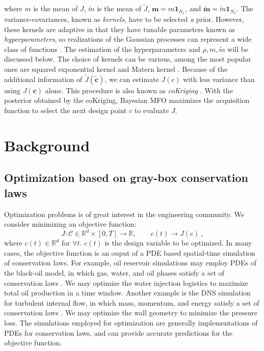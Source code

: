 \documentclass[a4paper,onecolumn]{article}
\theoremstyle{remark}
\begin{document}
where $m$ is the mean of $J$, $\tilde{m}$ is the mean of $\tilde{J}$, $\mathbf{m} =
m \mathbf{1}_{N_1}$, and $\mathbf{\tilde{m}} =\tilde{m}\mathbf{1}_{N_2}$.
The variance-covariances, known as \emph{kernels}, have to be selected \emph{a} prior.
However, these kernels are adaptive in that they have tunable parameters known as
\emph{hyperparameters}, so realizations of the Gaussian processes
can represent a wide class of functions \cite{RKHS aronszajn}. 
The estimation of the hyperparameters and $\rho, m, \tilde{m}$ will be discussed below.
The choice of kernels can be various, among the most popular ones are
squared exponential kernel and Matern kernel \cite{practicalBayesianopt}.
Because of the additional information of $\tilde{J}(\tilde{\mathbf{c}})$, 
we can estimate
$J(c)$ with less variance than using $J(\mathbf{c})$ alone.
This procedure is also known as \emph{coKriging} \cite{cokriging}. 
With the posterior obtained by the coKriging, Bayesian MFO maximizes the acquisition
function to select the next design point $c$ to evaluate $J$.\\




\newpage
\tableofcontents


\newpage
\section{Background}
\label{intro}

\subsection{Optimization based on gray-box conservation laws}
Optimization problems is of great interest in the engineering community. We consider minimizing an
objective function:
$$
    J: \mathcal{C} \in \mathbb{R}^d\times [0,T] \rightarrow \mathbb{R}, \qquad c(t) \rightarrow J(c)\,,
$$
where $c(t) \in \mathbb{R}^d$ for $\forall t$. $c(t)$ is the design variable to be optimized.
In many cases, the objective function is an ouput of
a PDE based spatial-time simulation of conservation laws. 
For example, oil reservoir simulations may employ PDEs of the black-oil model, 
in which gas, water, and oil phases satisfy a set of conservation laws 
\cite{reservoir simulation book}. 
We may optimize the water injection logistics to maximize total oil production in a time window.
Another example is the DNS simulation for turbulent internal flow, in which mass, momentum, and energy
satisfy a set of conservation laws
\cite{Wilcox CFD}.
We may optimize the wall geometry to minimize the pressure loss.
The simulations employed for optimization are generally
implementations of PDEs for conservation laws, and can provide accurate predictions for 
the objective function.\\
\end{document}
